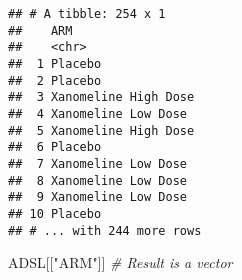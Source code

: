 \documentclass[]{book}
\newenvironment{Shaded}{\begin{snugshade}}{\end{snugshade}}
\newcommand{\CommentTok}[1]{\textcolor[rgb]{0.56,0.35,0.01}{\textit{#1}}}
\newcommand{\NormalTok}[1]{#1}
\newcommand{\StringTok}[1]{\textcolor[rgb]{0.31,0.60,0.02}{#1}}
\begin{document}
\begin{verbatim}
## # A tibble: 254 x 1
##    ARM                 
##    <chr>               
##  1 Placebo             
##  2 Placebo             
##  3 Xanomeline High Dose
##  4 Xanomeline Low Dose 
##  5 Xanomeline High Dose
##  6 Placebo             
##  7 Xanomeline Low Dose 
##  8 Xanomeline Low Dose 
##  9 Xanomeline Low Dose 
## 10 Placebo             
## # ... with 244 more rows
\end{verbatim}

\begin{Shaded}
\begin{Highlighting}[]
\NormalTok{ADSL[[}\StringTok{"ARM"}\NormalTok{]]     }\CommentTok{# Result is a vector}
\end{Highlighting}
\end{Shaded}
\end{document}
